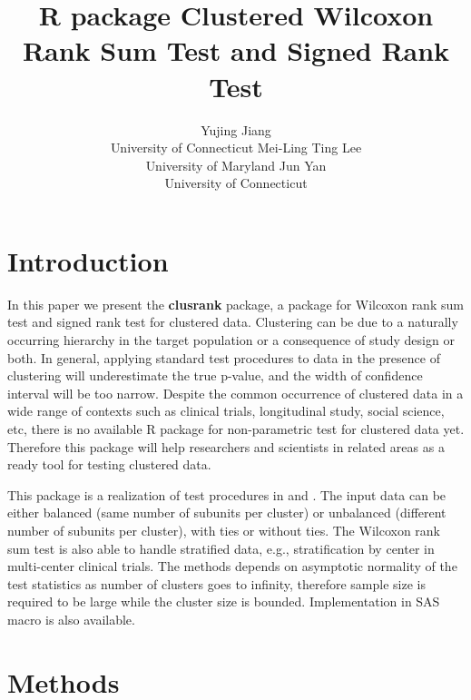 \documentclass[article]{jss}
\author{Yujing Jiang\\ University of Connecticut \And 
        Mei-Ling Ting Lee\\ University of Maryland
        \And  
        Jun Yan\\ University of Connecticut }
\title{R package Clustered Wilcoxon Rank Sum Test and Signed Rank Test}
\begin{document}

\section{Introduction}
In this paper we present the \textbf{clusrank} package, a package 
for Wilcoxon rank sum test \cite{Rosn:GLyn:Lee:inco:2003} 
and signed rank test \citep{Rosn:Glyn:Lee:wilc:2006} 
for clustered data.  Clustering can be due to 
a naturally occurring hierarchy in the target population
or a consequence of study design or both. In general,
applying standard test procedures to data in the presence 
of clustering will underestimate the true p-value, and 
the width of confidence interval will be too narrow.  
Despite the common occurrence of 
clustered data in a wide range of contexts such as 
clinical trials, longitudinal study, social science, etc,
there is no available R package for non-parametric test
for clustered data yet. Therefore this package will help 
researchers and scientists in related areas as a ready tool
for testing clustered data.



This package is a realization of test procedures in 
\citet{Rosn:GLyn:Lee:inco:2003} and \citet{Roxn:Glyn:Lee:wilc:2006}.
The input data can be either balanced (same number of 
subunits per cluster) or unbalanced (different number of subunits 
per cluster), with ties or without ties. The Wilcoxon rank sum
test is also able to handle stratified data, e.g., stratification
by center in multi-center clinical trials. The methods depends
on asymptotic normality of the test statistics as number of 
clusters goes to infinity, therefore
sample size is required to be large while the cluster size is bounded. Implementation in
SAS macro is also available.


\section{Methods}
\end{document}
